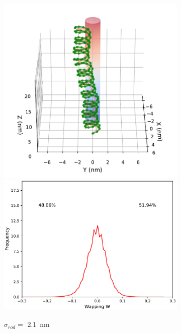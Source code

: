 \documentclass[a4paper,10pt]{article}
\begin{document}
\begin{figure}[tb]
\centering
\begin{subfigure}{.3\textwidth}
\includegraphics[width=\textwidth]{r1_A_2000000.pdf}
\includegraphics[width=\textwidth]{r1_A_wr_pr.pdf}
\caption{$\sigma_{rod}=$ \SI{2.1}{\nm}}
\label{fig:r1_a}
\end{subfigure}
\begin{subfigure}{.3\textwidth}

\end{subfigure}
\end{figure}
\end{document}
